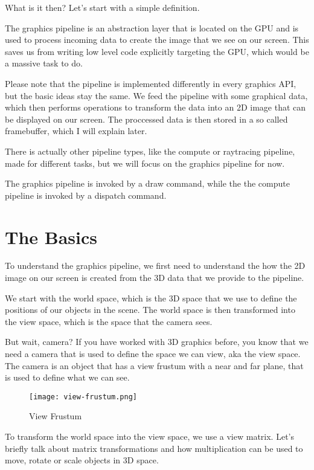 \documentclass[12pt]{report} \usepackage{preamble}
\begin{document}
What is it then? Let's start with a simple definition.

The graphics pipeline is an abstraction layer that is located on the
GPU and is used to process incoming data to create the image that we see
on our screen. \cite{vkGuide} This saves us from writing low level code
explicitly targeting the GPU, which would be a massive task to do.

Please note that the pipeline is implemented differently in every graphics
API, but the basic ideas stay the same. We feed the pipeline with some
graphical data, which then performs operations to transform the data into
an 2D image that can be displayed on our screen. The proccessed data
is then stored in a so called framebuffer, which I will explain later.
\cite{vkGuide}

There is actually other pipeline types, like the compute or raytracing
pipeline, made for different tasks, but we will focus on the graphics
pipeline for now.

The graphics pipeline is invoked by a draw command,
while the the compute pipeline is invoked by a dispatch
command. \cite{build-pipeline} \\
\cite{vulkan-tutorial-compute-shader}

\section{The Basics}

To understand the graphics pipeline, we first need to understand the
how the 2D image on our screen is created from the 3D data that we
provide to the pipeline.

We start with the world space, which is the 3D space that we use to
define the positions of our objects in the scene. The world space is
then transformed into the view space, which is the space that the
camera sees. \cite{fig:view-frustum}

But wait, camera? If you have worked with 3D graphics before, you know
that we need a camera that is used to define the space we can view, aka
the view space. The camera is an object that has a view frustum
with a near and far plane, that is used to define what we can see.

\begin{figure}[hbtp]
	\centering \texttt{[image: view-frustum.png]}
	\caption{View Frustum \cite{fig:view-frustum}}
\end{figure}

To transform the world space into the view space, we use a view matrix.
Let's briefly talk about matrix transformations and how multiplication
can be used to move, rotate or scale objects in 3D space.
\end{document}
